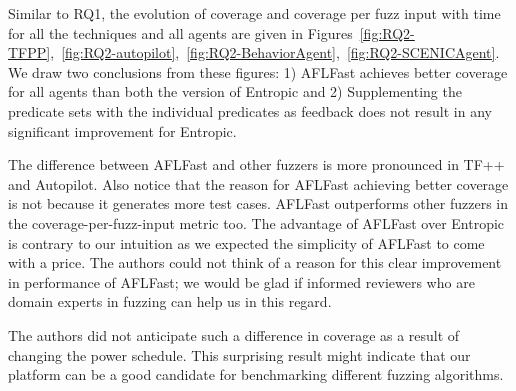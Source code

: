 Similar to RQ1, the evolution of coverage and coverage per fuzz input with time for all the techniques and all agents are given in Figures~\ref{fig:RQ2-TFPP},~\ref{fig:RQ2-autopilot},~\ref{fig:RQ2-BehaviorAgent},~\ref{fig:RQ2-SCENICAgent}.
% 
We draw two conclusions from these figures: 1) AFLFast achieves better coverage for all agents than both the version of Entropic and 2) Supplementing the predicate sets with the individual predicates as feedback does not result in any significant improvement for Entropic.
% 
% 
%


The difference between AFLFast and other fuzzers is more pronounced in TF++ and Autopilot.
%
Also notice that the reason for AFLFast achieving better coverage is not because it generates more test cases.
% 
AFLFast outperforms other fuzzers in the coverage-per-fuzz-input metric too.
% 
The advantage of AFLFast over Entropic is contrary to our intuition as we expected the simplicity of AFLFast to come with a price.
%
The authors could not think of a reason for this clear improvement in performance of AFLFast; we would be glad if informed reviewers who are domain experts in fuzzing can help us in this regard.


The authors did not anticipate such a difference in coverage as a result of changing the power schedule.
% 
This surprising result might indicate that our platform can be a good candidate for benchmarking different fuzzing algorithms.
% 


